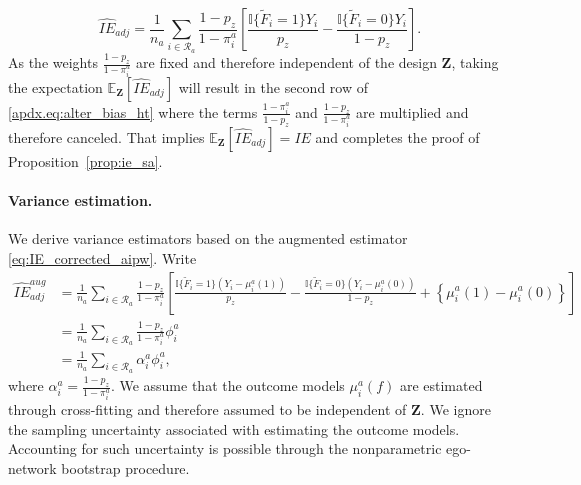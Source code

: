 \documentclass[11pt]{article}
\theoremstyle{definition}
\def \bZ {\boldsymbol{Z}}
\def \cR {\mathcal{R}}
\def \EX {\mathbb{E}}
\begin{document}
\begin{equation*}
    \widehat{IE}_{adj} = 
    \frac{1}{n_a}
    \sum_{i \in \cR_a}
    \frac{1-p_z}{1-\pi_i^a}
    \left[
    \frac{
    \mathbb{I}\{\widetilde{F}_i=1\}Y_i}{p_z} 
    -
    \frac{
    \mathbb{I}\{\widetilde{F}_i=0\}Y_i}{1 - p_z} 
    \right].
\end{equation*}
As the weights $\frac{1-p_z}{1-\pi_i^a}$ are fixed and therefore independent of the design $\bZ$, taking the expectation $\EX_{\bZ}\left[\widehat{IE}_{adj}\right]$
will result in the second row of \eqref{apdx.eq:alter_bias_ht} where the terms $\frac{1-\pi_i^a}{1-p_z}$ and $\frac{1-p_z}{1-\pi_i^a}$ are multiplied and therefore canceled. That implies $\EX_{\bZ}\left[\widehat{IE}_{adj}\right]= IE$ and completes the proof of Proposition~\ref{prop:ie_sa}.

\paragraph{Variance estimation.} We derive variance estimators based on the augmented estimator \eqref{eq:IE_corrected_aipw}. Write
\begin{align*}
    \widehat{IE}_{adj}^{aug} &= 
    \frac{1}{n_a}
    \sum_{i \in \cR_a}
    \frac{1-p_z}{1-\pi_i^a}
    \left[
    \frac{
    \mathbb{I}\{
    \widetilde{F}_i=1\}\left(Y_i - \mu^a_i(1) \right)}{p_z} 
    -
    \frac{
    \mathbb{I}\{\widetilde{F}_i=0\}\left(Y_i - \mu^a_i(0) \right)}{1 - p_z} 
    + \left\{\mu^a_i(1) - \mu^a_i(0) \right\}
    \right]
    \\ &=
    \frac{1}{n_a}
    \sum_{i \in \cR_a}
    \frac{1-p_z}{1-\pi_i^a} \phi_i^a
    \\ &=
    \frac{1}{n_a}
    \sum_{i \in \cR_a}
    \alpha_i^a \phi_i^a,
\end{align*}
where $\alpha_i^a = \frac{1-p_z}{1-\pi_i^a}$.
We assume that the outcome models $\mu^a_i(f)$ are estimated through cross-fitting \citep{Chernozhukov2018}
 and therefore assumed to be independent of $\bZ$.
  We ignore the sampling uncertainty associated with estimating the outcome models. 
Accounting for such uncertainty is possible through the nonparametric ego-network bootstrap procedure.
\end{document}
